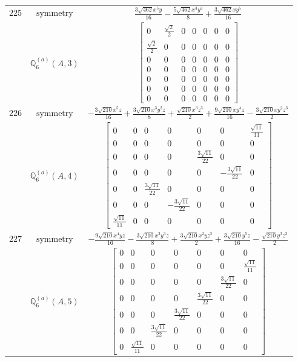 \documentclass[fleqn,8pt,landscape]{jsarticle}
\begin{document}
\begin{longtable}{ccc}
$ 225 $ & $ \text{symmetry} $ & $ \frac{3 \sqrt{462} x^{5} y}{16} - \frac{5 \sqrt{462} x^{3} y^{3}}{8} + \frac{3 \sqrt{462} x y^{5}}{16} $ \\
$  $ & $ \mathbb{Q}_{6}^{(a)}(A,3) $ & $ \begin{bmatrix} 0 & \frac{\sqrt{2}}{2} & 0 & 0 & 0 & 0 & 0 \\ \frac{\sqrt{2}}{2} & 0 & 0 & 0 & 0 & 0 & 0 \\ 0 & 0 & 0 & 0 & 0 & 0 & 0 \\ 0 & 0 & 0 & 0 & 0 & 0 & 0 \\ 0 & 0 & 0 & 0 & 0 & 0 & 0 \\ 0 & 0 & 0 & 0 & 0 & 0 & 0 \\ 0 & 0 & 0 & 0 & 0 & 0 & 0 \end{bmatrix} $ \\ \hline
$ 226 $ & $ \text{symmetry} $ & $ - \frac{3 \sqrt{210} x^{5} z}{16} + \frac{3 \sqrt{210} x^{3} y^{2} z}{8} + \frac{\sqrt{210} x^{3} z^{3}}{2} + \frac{9 \sqrt{210} x y^{4} z}{16} - \frac{3 \sqrt{210} x y^{2} z^{3}}{2} $ \\
$  $ & $ \mathbb{Q}_{6}^{(a)}(A,4) $ & $ \begin{bmatrix} 0 & 0 & 0 & 0 & 0 & 0 & \frac{\sqrt{11}}{11} \\ 0 & 0 & 0 & 0 & 0 & 0 & 0 \\ 0 & 0 & 0 & 0 & \frac{3 \sqrt{11}}{22} & 0 & 0 \\ 0 & 0 & 0 & 0 & 0 & - \frac{3 \sqrt{11}}{22} & 0 \\ 0 & 0 & \frac{3 \sqrt{11}}{22} & 0 & 0 & 0 & 0 \\ 0 & 0 & 0 & - \frac{3 \sqrt{11}}{22} & 0 & 0 & 0 \\ \frac{\sqrt{11}}{11} & 0 & 0 & 0 & 0 & 0 & 0 \end{bmatrix} $ \\ \hline
$ 227 $ & $ \text{symmetry} $ & $ - \frac{9 \sqrt{210} x^{4} y z}{16} - \frac{3 \sqrt{210} x^{2} y^{3} z}{8} + \frac{3 \sqrt{210} x^{2} y z^{3}}{2} + \frac{3 \sqrt{210} y^{5} z}{16} - \frac{\sqrt{210} y^{3} z^{3}}{2} $ \\
$  $ & $ \mathbb{Q}_{6}^{(a)}(A,5) $ & $ \begin{bmatrix} 0 & 0 & 0 & 0 & 0 & 0 & 0 \\ 0 & 0 & 0 & 0 & 0 & 0 & \frac{\sqrt{11}}{11} \\ 0 & 0 & 0 & 0 & 0 & \frac{3 \sqrt{11}}{22} & 0 \\ 0 & 0 & 0 & 0 & \frac{3 \sqrt{11}}{22} & 0 & 0 \\ 0 & 0 & 0 & \frac{3 \sqrt{11}}{22} & 0 & 0 & 0 \\ 0 & 0 & \frac{3 \sqrt{11}}{22} & 0 & 0 & 0 & 0 \\ 0 & \frac{\sqrt{11}}{11} & 0 & 0 & 0 & 0 & 0 \end{bmatrix} $ \\ \hline

\end{longtable}
\end{document}

